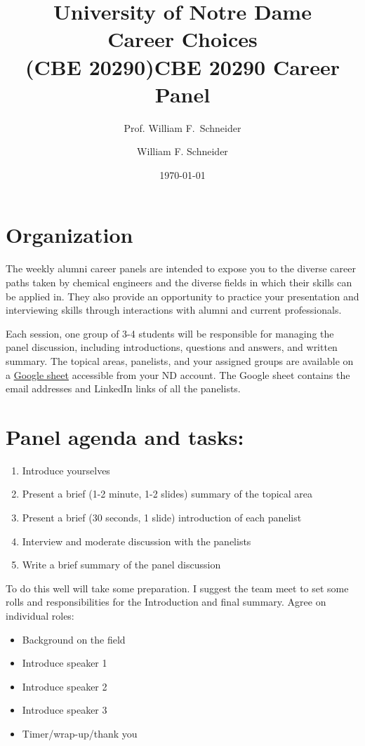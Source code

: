 \documentclass[11pt]{article}
\title{University of Notre Dame\\Career Choices\\(CBE 20290)}
\author{Prof. William F.\ Schneider}
\author{William F. Schneider}
\date{\today}
\title{CBE 20290 Career Panel}
\begin{document}
\begin{OPTIONS}
\end{OPTIONS}

\section{Organization}
\label{sec:org48b26d9}
The weekly alumni career panels are intended to expose you to the diverse career paths taken by chemical engineers and  the diverse fields in which their skills can be applied in. They also provide an opportunity to practice your presentation and interviewing skills through interactions with alumni and current professionals.

Each session, one group of 3-4 students will be responsible for managing the panel discussion, including introductions, questions and answers, and written summary. The topical areas, panelists, and your assigned groups  are available on a \href{https://docs.google.com/spreadsheets/d/1cjuvP2S-zgWGZjiKhLU1Qg3ROS5dn2VucOxKP6T6Hpw/edit?usp=sharing}{Google sheet}  accessible from your ND account.  The Google sheet contains the email addresses and LinkedIn links of all the panelists.

\section{Panel agenda and tasks:}
\label{sec:org23820c3}
\begin{enumerate}
\item Introduce yourselves
\item Present a brief (1-2  minute, 1-2 slides) summary of the topical area
\item Present a brief (30 seconds, 1 slide) introduction of each panelist
\item Interview and moderate discussion with the panelists
\item Write a brief summary of the panel discussion
\end{enumerate}

To do this well will take some preparation. I suggest the team meet to set some rolls and responsibilities for the Introduction and final summary. Agree on individual roles:
\begin{itemize}
\item Background on the field
\item Introduce speaker 1
\item Introduce speaker 2
\item Introduce speaker 3
\item Timer/wrap-up/thank you
\end{itemize}
\end{document}
